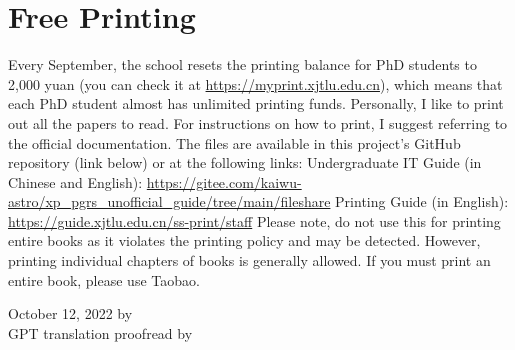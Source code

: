 \section{Free Printing}

Every September, the school resets the printing balance for PhD students to 2,000 yuan (you can check it at \url{https://myprint.xjtlu.edu.cn}), which means that each PhD student almost has unlimited printing funds. Personally, I like to print out all the papers to read.
For instructions on how to print, I suggest referring to the official documentation. The files are available in this project’s GitHub repository (link below) or at the following links:
Undergraduate IT Guide (in Chinese and English): \url{https://gitee.com/kaiwu-astro/xp_pgrs_unofficial_guide/tree/main/fileshare}
Printing Guide (in English): \url{https://guide.xjtlu.edu.cn/ss-print/staff}
Please note, do not use this for printing entire books as it violates the printing policy and may be detected. However, printing individual chapters of books is generally allowed. If you must print an entire book, please use Taobao.

\begin{flushright} 
    October 12, 2022 by \Wu \\
    GPT translation proofread by \Shiyao
\end{flushright}